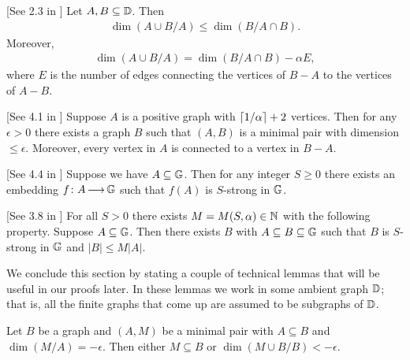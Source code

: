 \begin{Lemma} \label{diamond} [See 2.3 in \cite{laskowski}]
  Let $A, B \subseteq \mathbb D$.
  Then
  \begin{align*}
    \dim(A \cup B / A) \leq \dim(B / A \cap B).
  \end{align*}
  Moreover, 
  \begin{align*}
    \dim(A \cup B / A) = \dim(B / A \cap B) - \alpha E,
  \end{align*}
  where $E$ is the number of edges connecting the vertices of $B - A$ to the vertices of $A - B$.
\end{Lemma}

\begin{Lemma} \label{las_min} [See 4.1 in \cite{laskowski}]
  Suppose $A$ is a positive graph with $\left \lceil 1/\alpha \right \rceil + 2$ vertices.
  Then for any $\epsilon > 0$ there exists a graph $B$ such that $(A, B)$ is a minimal pair with dimension $\leq \epsilon$.
  Moreover, every vertex in $A$ is connected to a vertex in $B - A$.
\end{Lemma}

\begin{Lemma} \label{las_str} [See 4.4 in \cite{laskowski}]
  Suppose we have $A \subseteq \mathbb G$.
  Then for any integer $S \geq 0$ there exists an embedding $f \colon A \operatorname{\longrightarrow} \mathbb G$ such that $f(A)$ is $S$-strong in $\mathbb G$.
\end{Lemma}
    
\begin{Lemma} \label{las_closure} [See 3.8 in \cite{laskowski}]
  For all $S > 0$ there exists $M = M(S, \alpha) \in \mathbb{N}$ with the following property.
  Suppose $A \subseteq \mathbb G$.
  Then there exists $B$ with $A \subseteq B \subseteq \mathbb G$ such that $B$ is $S$-strong in $\mathbb G$ and $|B| \leq M|A|$.
\end{Lemma}

We conclude this section by stating a couple of technical lemmas that will be useful in our proofs later.
In these lemmas we work in some ambient graph $\mathbb D$; that is, all the finite graphs that come up are assumed to be subgraphs of $\mathbb D$.

\begin{Lemma} \label{minimal_over_set}
  Let $B$ be a graph and $(A, M)$ be a minimal pair with $A \subseteq B$ and $\dim(M/A) = -\epsilon$.
  Then either $M \subseteq B$ or $\dim(M \cup B/B) < -\epsilon$.
\end{Lemma}

